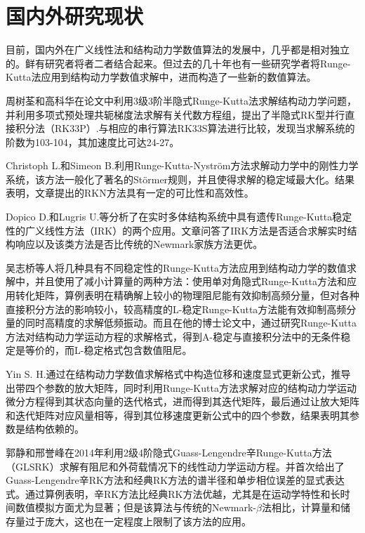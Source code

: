 \section{国内外研究现状}
目前，国内外在广义线性法和结构动力学数值算法的发展中，几乎都是相对独立的。鲜有研究者将者二者结合起来。但过去的几十年也有一些研究学者将Runge-Kutta法应用到结构动力学数值求解中，进而构造了一些新的数值算法。

周树荃和高科华\cite{ZhouShuQuan1992a}在论文中利用3级3阶半隐式Runge-Kutta法求解结构动力学问题，并利用多项式预处理共轭梯度法求解有关代数方程组，提出了半隐式RK型并行直接积分法（RK33P）.与相应的串行算法RK33S算法进行比较，发现当求解系统的阶数为103-104，其加速度比可达24-27。

Christoph L.和Simeon B.\cite{Lunk2004a,Lunk2005a}利用Runge-Kutta-Nyström方法求解动力学中的刚性力学系统，该方法一般化了著名的Störmer规则，并且使得求解的稳定域最大化。结果表明，文章提出的RKN方法具有一定的可比性和高效性。

Dopico D.和Lugris U.\cite{Dopico2010a}等分析了在实时多体结构系统中具有遗传Runge-Kutta稳定性的广义线性方法（IRK）的两个应用。文章问答了IRK方法是否适合求解实时结构响应以及该类方法是否比传统的Newmark家族方法更优。

吴志桥等人\cite{WuZhiQiao2010a}将几种具有不同稳定性的Runge-Kutta方法应用到结构动力学的数值求解中，并且使用了减小计算量的两种方法：使用单对角隐式Runge-Kutta方法和应用转化矩阵，算例表明在精确解上较小的物理阻尼能有效抑制高频分量，但对各种直接积分方法的影响较小，较高精度的L-稳定Runge-Kutta方法能有效抑制高频分量的同时高精度的求解低频振动。而且在他的博士论文\cite{WuZhiQiao2009a}中，通过研究Runge-Kutta方法对结构动力学运动方程的求解格式，得到A-稳定与直接积分法中的无条件稳定是等价的，而L-稳定格式包含数值阻尼。

Yin S. H.\cite{Yin2013a}通过在结构动力学数值求解格式中构造位移和速度显式更新公式，推导出带四个参数的放大矩阵，同时利用Runge-Kutta方法求解对应的结构动力学运动微分方程得到其状态向量的迭代格式，进而得到其迭代矩阵，最后通过让放大矩阵和迭代矩阵对应风量相等，得到其位移速度更新公式中的四个参数，结果表明其参数是结构依赖的。

郭静和邢誉峰\cite{GuoJing2014a}在2014年利用2级4阶隐式Guass-Lengendre辛Runge-Kutta方法（GLSRK）求解有阻尼和外荷载情况下的线性动力学运动方程。并首次给出了Guass-Lengendre辛RK方法和经典RK方法的谱半径和单步相位误差的显式表达式。通过算例表明，辛RK方法比经典RK方法优越，尤其是在运动学特性和长时间数值模拟方面尤为显著；但是该算法与传统的Newmark-$\beta$法相比，计算量和储存量过于庞大，这也在一定程度上限制了该方法的应用。

